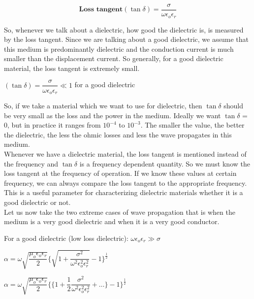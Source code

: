 \begin{equation}
\textbf{Loss tangent}(\tan\delta) = \dfrac{\sigma}{\omega\epsilon_{o}\epsilon_{r}}
\end{equation}

So, whenever we talk about a dielectric, how good the dielectric is, is measured by the loss tangent. Since we are talking about a good dielectric, we assume that this medium is predominantly dielectric and the conduction current is much smaller than the displacement current. So generally, for a good dielectric material, the loss tangent is extremely small. 

\begin{center}
$(\tan\delta) = \dfrac{\sigma}{\omega\epsilon_{o}\epsilon_{r}} \ll 1$ for a good dielectric
\end{center}

So, if we take a material which we want to use for dielectric, then $\tan\delta$ should be very small as the loss and the power in the medium. Ideally we want $\tan\delta$ = 0, but in practice it ranges from $10^{-4}$ to $10^{-3}$. The smaller the value, the better the dielectric, the less the ohmic losses and less the wave propagates in this medium.\\ 
Whenever we have a dielectric material, the loss tangent is mentioned instead of the frequency and $\tan\delta$ is a frequency dependent quantity. So we must know the loss tangent at the frequency of operation. If we know these values at certain frequency, we can always compare the loss tangent to the appropriate frequency. This is a useful parameter for characterizing dielectric materials whether it is a good dielectric or not.\\ 
Let us now take the two extreme cases of wave propagation that is when the medium is a very good dielectric and when it is a very good conductor.

For a good dielectric (low loss dielectric): $\omega\epsilon_{o}\epsilon_{r} \gg \sigma$

\begin{center}
$\alpha = \omega\sqrt{\dfrac{\mu_{o}\epsilon_{o}\epsilon_{r}}{2}}\Bigg\{{\sqrt{1 + \dfrac{\sigma^{2}}{\omega^{2}\epsilon_{o}^{2}\epsilon_{r}^{2}}}} - 1\Bigg\}^{\frac{1}{2}}$
\end{center}

\begin{center}
$\alpha = \omega\sqrt{\dfrac{\mu_{o}\epsilon_{o}\epsilon_{r}}{2}}\Bigg\{\bigg\{1 + \dfrac{1}{2} \dfrac{\sigma^{2}}{\omega^{2}\epsilon_{o}^{2}\epsilon_{r}^{2}} + \dots\bigg\} - 1\Bigg\}^{\frac{1}{2}}$
\end{center}

